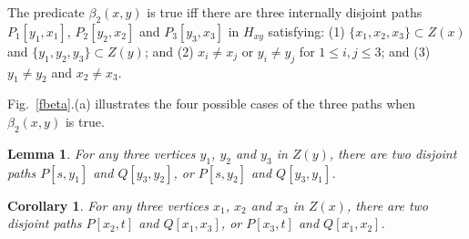 \documentclass[review]{elsarticle}
\def\squarebox#1{\hbox to #1{\hfill\vbox to #1{\vfill}}}
\renewcommand{\qed}{\hspace*{\fill}
            \vbox{\hrule\hbox{\vrule\squarebox{.667em}\vrule}\hrule}\smallskip\newline}
\newtheorem{lem}[thm]{Lemma}
\newtheorem{cor}[thm]{Corollary}
\begin{document}
\begin{defi}
The predicate $\beta_2(x,y)$ is true iff there are three internally
disjoint paths $P_1[y_1,x_1]$, $P_2[y_2,x_2]$ and $P_3[y_3,x_3]$ in
$H_{xy}$ satisfying: (1) $\{x_1,x_2,x_3\}\subset Z(x)$ and
$\{y_1,y_2,y_3\}\subset Z(y)$; and (2) $x_i\neq x_j$ or $y_i\neq
y_j$ for $1\leqslant i,j\leqslant 3$; and (3) $y_1\neq y_2$ and
$x_2\neq x_3$.
\end{defi}


Fig.~\ref{fbeta}.(a) illustrates the four possible cases of the
three paths when $\beta_2(x,y)$ is true.
\begin{lem}\label{3v2path}
For any three vertices $y_1$, $y_2$ and $y_3$ in $Z(y)$, there are
two disjoint paths $P[s,y_1]$ and $Q[y_3,y_2]$, or $P[s,y_2]$ and
$Q[y_3,y_1]$.
\end{lem}
\begin{cor}\label{3v2pathb}
For any three vertices $x_1$, $x_2$ and $x_3$ in $Z(x)$, there are
two disjoint paths $P[x_2,t]$ and $Q[x_1,x_3]$, or $P[x_3,t]$ and
$Q[x_1,x_2]$.
\end{cor}
\end{document}
